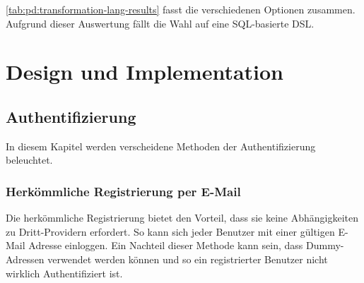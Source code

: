 \cref{tab:pd:transformation-lang-results} fasst die verschiedenen Optionen zusammen.
Aufgrund dieser Auswertung fällt die Wahl auf eine SQL-basierte DSL.

\chapter{Design und Implementation}

\section{Authentifizierung}
\xxx[@rliebi: kapitel design = IST zustand. hier hat es vergleiche]
In diesem Kapitel werden verscheidene Methoden der Authentifizierung beleuchtet.
\subsection{Herkömmliche Registrierung per E-Mail}
Die herkömmliche Registrierung bietet den Vorteil, dass sie keine Abhängigkeiten zu Dritt-Providern erfordert. So kann sich jeder Benutzer mit einer gültigen E-Mail Adresse einloggen. Ein Nachteil dieser Methode kann sein, dass Dummy-Adressen verwendet werden können und so ein registrierter Benutzer nicht wirklich Authentifiziert ist.

